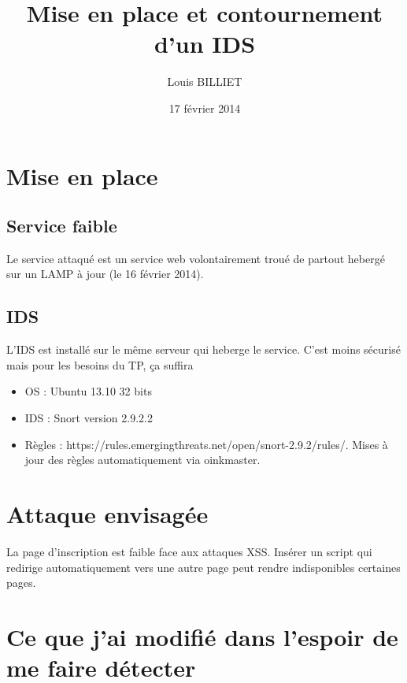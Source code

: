 \documentclass[oneside,10pt]{article}
\begin{document}
\title{Mise en place et contournement d'un IDS}
\author{Louis BILLIET}
\date{17 f\'evrier 2014}
\maketitle

\section{Mise en place}
\subsection{Service faible}
Le service attaqu\'e est un service web volontairement trou\'e de partout heberg\'e sur un LAMP \`a jour (le 16 f\'evrier 2014).

\subsection{IDS}
L'IDS est install\'e sur le m\^eme serveur qui heberge le service.
C'est moins s\'ecuris\'e mais pour les besoins du TP, \c ca suffira
\begin{itemize}
\item OS : Ubuntu 13.10 32 bits
\item IDS : Snort version 2.9.2.2
\item R\`egles : https://rules.emergingthreats.net/open/snort-2.9.2/rules/.
Mises \`a jour des r\`egles automatiquement via oinkmaster.
\end{itemize}

\section{Attaque envisag\'ee}
La page d'inscription est faible face aux attaques XSS.
Ins\'erer un script qui redirige automatiquement vers une autre page peut rendre indisponibles certaines pages.

\section{Ce que j'ai modifi\'e dans l'espoir de me faire d\'etecter}
\end{document}
